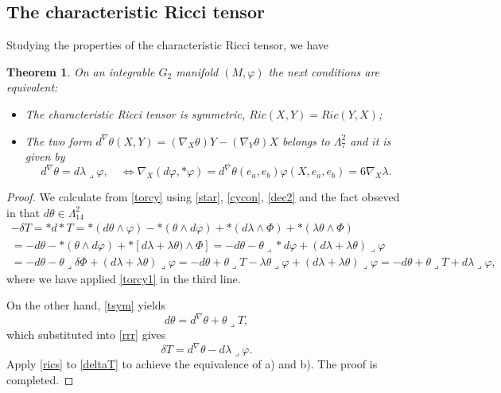 \documentclass[10pt,british]{article}
\newtheorem{thrm}{Theorem}[section]
\def\sb {{\nabla}}
\def\p{{\varphi}}
\def\ph{{\Phi}}
\begin{document}
\subsection{The characteristic Ricci tensor}
Studying the properties of the characteristic Ricci tensor, we have
\begin{thrm}\label{maing2}
On an integrable     $G_2$ manifold $(M,\p)$ the next conditions are equivalent:
\begin{itemize}
\item[a)] The characteristic Ricci tensor  is symmetric, $Ric(X,Y)=Ric(Y,X)$;
\item[b)] The two form $d^{\sb}\theta(X,Y)=(\sb_X\theta)Y-(\sb_Y\theta)X$ belongs to $\Lambda^2_7$ and it is given by
 \begin{equation}\label{newsymth}
d^{\sb}\theta=d\lambda\lrcorner\p, \quad \Leftrightarrow 
 \sb_X(d\p,*\p)=d^{\sb}\theta(e_a,e_b)\p(X,e_a,e_b)=6\sb_X\lambda.
 \end{equation}
 \end{itemize}
\end{thrm}
\begin{proof}
We calculate from \eqref{torcy} using \eqref{star}, \eqref{cycon},  \eqref{dec2} and the fact obseved in \cite{Kar1} that $d\theta\in\Lambda^2_{14}$ 
\begin{multline}\label{rrr}
-\delta T=*d*T=*(d\theta\wedge\p)-*(\theta\wedge d\p)+*(d\lambda\wedge\ph) +*(\lambda\theta\wedge\ph)\\=-d\theta-*(\theta\wedge d\p)+*[d\lambda+\lambda\theta)\wedge\ph]=-d\theta-\theta\lrcorner*d\p+(d\lambda+\lambda\theta)\lrcorner\p\\=-d\theta-\theta\lrcorner\delta\ph+(d\lambda+\lambda\theta)\lrcorner\p=-d\theta+\theta\lrcorner T-\lambda\theta\lrcorner\p+(d\lambda+\lambda\theta)\lrcorner\p=-d\theta+\theta\lrcorner T+d\lambda\lrcorner\p, 
\end{multline}
where we have applied \eqref{torcy1} in the third line.

On the other hand, \eqref{tsym} yields
\begin{equation}\label{ttg2}
d\theta=d^{\sb}\theta+\theta\lrcorner T,%
\end{equation}
 which substituted into \eqref{rrr} gives
\begin{equation}\label{deltaT}
\delta T=d^{\sb}\theta-d\lambda\lrcorner\p.
\end{equation}
Apply \eqref{rics} to \eqref{deltaT} to achieve the equivalence of a) and b). The proof is completed.
\end{proof}
\end{document}
